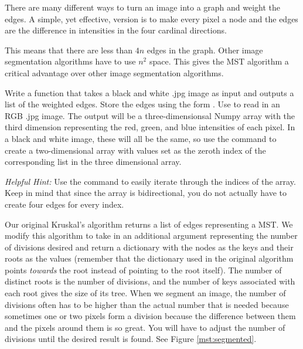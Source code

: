 There are many different ways to turn an image into a graph and weight the edges.
A simple, yet effective, version is to make every pixel a node and the edges are the difference in intensities in the four cardinal directions.

This means that there are less than $4n$ edges in the graph.
Other image segmentation algorithms have to use $n^2$ space.
This gives the MST algorithm a critical advantage over other image segmentation algorithms.

\begin{problem}
Write a function that takes a black and white .jpg image as input and outputs a list of the weighted edges.
Store the edges using the form . Use  to read in an RGB .jpg image. The output will be a three-dimensionsal Numpy array with the third dimension representing the red, green, and blue intensities of each pixel. In a black and white image, these will all be the same, so use the command  to create a two-dimensional array with values set as the zeroth index of the corresponding list in the three dimensional array.

\emph{Helpful Hint:} Use the  command to easily iterate through the indices of the array. Keep in mind that since the array is bidirectional, you do not actually have to create four edges for every index.
\end{problem}

Our original Kruskal's algorithm returns a list of edges representing a MST. We modify this algorithm to take in an additional argument representing the number of divisions desired and return a dictionary with the nodes as the keys and their roots as the values (remember that the dictionary used in the original algorithm points \emph{towards} the root instead of pointing to the root itself). The number of distinct roots is the number of divisions, and the number of keys associated with each root gives the size of its tree. When we segment an image, the number of divisions often has to be higher than the actual number that is needed because sometimes one or two pixels form a division because the difference between them and the pixels around them is so great. You will have to adjust the number of divisions until the desired result is found.  See Figure \ref{mst:segmented}.

